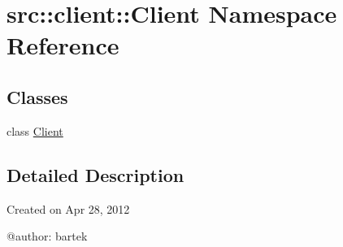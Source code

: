 \hypertarget{namespacesrc_1_1client_1_1Client}{
\section{src::client::Client Namespace Reference}
\label{namespacesrc_1_1client_1_1Client}
}
\subsection*{Classes}
\begin{DoxyCompactItemize}
\item 
class \hyperlink{classsrc_1_1client_1_1Client_1_1Client}{Client}
\end{DoxyCompactItemize}


\subsection{Detailed Description}
\begin{DoxyVerb}
Created on Apr 28, 2012

@author: bartek
\end{DoxyVerb}
 
